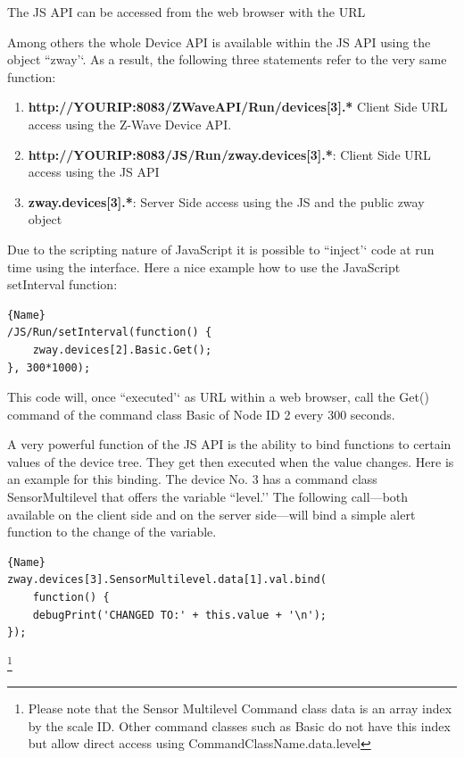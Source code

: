 The JS API can be accessed from the web browser with the URL



Among others the whole \zwave Device API is available within the JS API using 
the object ``zway’‘. As a result, the following three statements refer to the very same function:

\begin{enumerate}
\item \textbf{http://YOURIP:8083/ZWaveAPI/Run/devices[3].*} Client Side URL access using the Z-Wave Device API.
\item \textbf{http://YOURIP:8083/JS/Run/zway.devices[3].*}: Client Side URL access using the JS API
\item \textbf{zway.devices[3].*}: Server Side access using the JS and the public zway object
\end{enumerate}

Due to the scripting nature of JavaScript it is possible to ``inject’‘ code at run time 
using the interface. Here a nice example how to use the JavaScript setInterval function:

\begin{lstlisting}[caption=Polling of device \#2, basicstyle=\small]{Name}
/JS/Run/setInterval(function() {
	zway.devices[2].Basic.Get();
}, 300*1000);
\end{lstlisting}

This code will, once ``executed’‘ as URL within a web browser, call the Get() command
of the command class Basic of Node ID 2 every 300 seconds.

A very powerful function of the JS API is the ability to bind functions to certain values 
of the device tree. They get then executed when the value changes. Here is an example 
for this binding. The device No. 3 has a command class SensorMultilevel that offers 
the variable ``level.’’ The following call---both available on the client side and 
on the server side---will bind a simple alert function to the change of the variable.

\begin{lstlisting}[caption=Bind a function, basicstyle=\small]{Name}
zway.devices[3].SensorMultilevel.data[1].val.bind( 
	function() {
	debugPrint('CHANGED TO:' + this.value + '\n');
});
\end{lstlisting}

\footnote{Please note that the Sensor Multilevel Command class data is an array index 
by the scale ID. Other command classes such as Basic do not have this index but allow 
direct access using CommandClassName.data.level}

